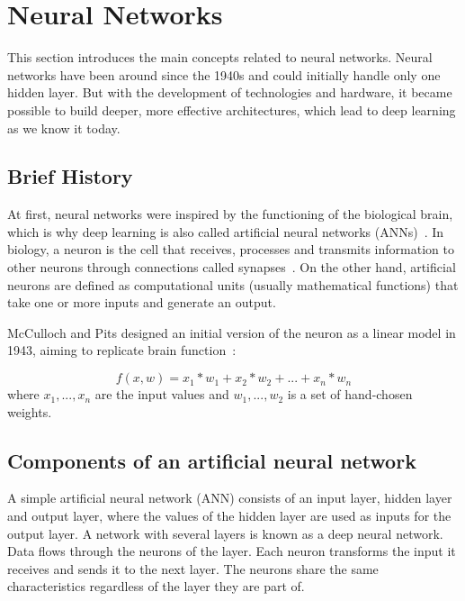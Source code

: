 \section{Neural Networks}
This section introduces the main concepts related to neural networks. Neural networks have been around since the 1940s and could initially handle only one hidden layer. But with the development of technologies and hardware, it became possible to build deeper, more effective architectures, which lead to deep learning as we know it today. \par



\subsection{Brief History}


At first, neural networks were inspired by the functioning of the biological brain, which is why deep learning is also called artificial neural networks (ANNs)~\cite{Goodfellow-et-al-2016}. In biology, a neuron is the cell that receives, processes and transmits information to other neurons through connections called synapses~\cite{neuron}. On the other hand, artificial neurons are defined as computational units (usually mathematical functions) that take one or more inputs and generate an output. \par

McCulloch and Pits designed an initial version of the neuron as a linear model in 1943, aiming to replicate brain function~\cite{REF:11}:


\begin{equation}
f(x,w)=x_1*w_1 +x_2*w_2 +...+x_n*w_n
\end{equation}
where $x_1, ..., x_n$ are the input values and $w_1, ..., w_2$ is a set of hand-chosen weights.

\subsection{Components of an artificial neural network}

A simple artificial neural network (ANN) consists of an input layer, hidden layer and output layer, where the values of the hidden layer are used as inputs for the output layer. A network with several layers is known as a deep neural network. Data flows through the neurons of the layer. Each neuron transforms the input it receives and sends it to the next layer. The neurons share the same characteristics regardless of the layer they are part of. \par



